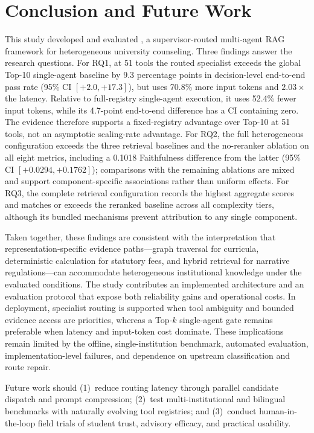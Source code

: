 \section{Conclusion and Future Work}
\label{sec:conclusion}

This study developed and evaluated \system{}, a supervisor-routed multi-agent RAG framework for heterogeneous university counseling. Three findings answer the research questions. For RQ1, at 51 tools the routed specialist exceeds the global Top-10 single-agent baseline by 9.3 percentage points in decision-level end-to-end pass rate (95\% CI $[+2.0,+17.3]$), but uses 70.8\% more input tokens and $2.03\times$ the latency. Relative to full-registry single-agent execution, it uses 52.4\% fewer input tokens, while its 4.7-point end-to-end difference has a CI containing zero. The evidence therefore supports a fixed-registry advantage over Top-10 at 51 tools, not an asymptotic scaling-rate advantage. For RQ2, the full heterogeneous configuration exceeds the three retrieval baselines and the no-reranker ablation on all eight metrics, including a 0.1018 Faithfulness difference from the latter (95\% CI $[+0.0294,+0.1762]$); comparisons with the remaining ablations are mixed and support component-specific associations rather than uniform effects. For RQ3, the complete retrieval configuration records the highest aggregate scores and matches or exceeds the reranked baseline across all complexity tiers, although its bundled mechanisms prevent attribution to any single component.

Taken together, these findings are consistent with the interpretation that representation-specific evidence paths---graph traversal for curricula, deterministic calculation for statutory fees, and hybrid retrieval for narrative regulations---can accommodate heterogeneous institutional knowledge under the evaluated conditions. The study contributes an implemented architecture and an evaluation protocol that expose both reliability gains and operational costs. In deployment, specialist routing is supported when tool ambiguity and bounded evidence access are priorities, whereas a Top-$k$ single-agent gate remains preferable when latency and input-token cost dominate. These implications remain limited by the offline, single-institution benchmark, automated evaluation, implementation-level failures, and dependence on upstream classification and route repair.

Future work should (1)~reduce routing latency through parallel candidate dispatch and prompt compression; (2)~test multi-institutional and bilingual benchmarks with naturally evolving tool registries; and (3)~conduct human-in-the-loop field trials of student trust, advisory efficacy, and practical usability.
